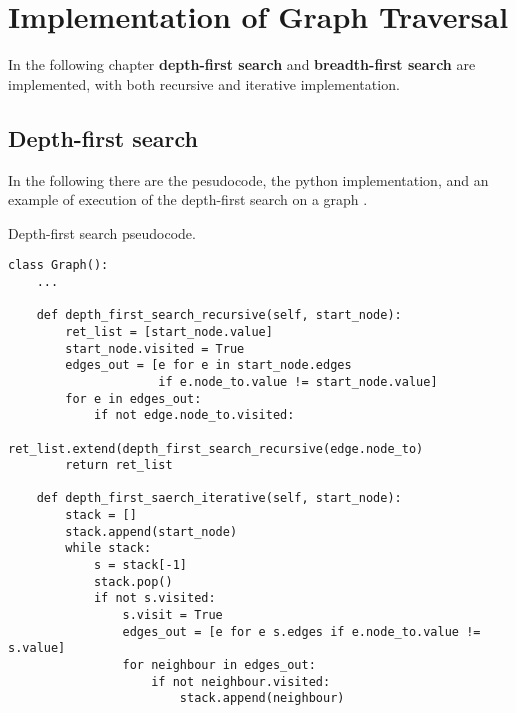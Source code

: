 \chapter{Implementation of Graph Traversal}
\label{graphimplementationtraversalappendix}
In the following chapter \textbf{depth-first search} and \textbf{breadth-first search} are implemented, with both recursive and iterative implementation.
\section{Depth-first search}
In the following there are the pesudocode, the python implementation, and an example of execution of the depth-first search on a graph \cite{wikidepthfirst}.

\begin{algorithm}[H]
	\DontPrintSemicolon
	\LinesNumbered
  	\;
\caption{Depth-first search pseudocode.}
\end{algorithm}

\begin{lstlisting}[firstnumber=1, caption={Recursive and iterative implementation of depth-first search on graphs.}]	
class Graph():
	...
	
	def depth_first_search_recursive(self, start_node):
		ret_list = [start_node.value]
		start_node.visited = True
		edges_out = [e for e in start_node.edges
					 if e.node_to.value != start_node.value]
		for e in edges_out:
			if not edge.node_to.visited:
				ret_list.extend(depth_first_search_recursive(edge.node_to)
		return ret_list
	
	def depth_first_saerch_iterative(self, start_node):
  		stack = []
		stack.append(start_node)
  		while stack:
  			s = stack[-1]
  			stack.pop()
			if not s.visited:
				s.visit = True 
    			edges_out = [e for e s.edges if e.node_to.value != s.value]
    			for neighbour in edges_out:
    				if not neighbour.visited:
    					stack.append(neighbour)
\end{lstlisting}


